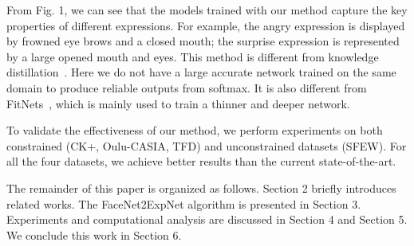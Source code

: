 \documentclass[a4paper, 10pt, conference]{ieeeconf}      %
\begin{document}
From Fig. 1, we can see that the models trained with our method capture the key properties of different expressions. For example, the angry expression is displayed by frowned eye brows and a closed mouth; the surprise expression is represented by a large opened mouth and eyes. 
This method is different from knowledge distillation~\cite{hinton2015distilling}. Here we do not have a large accurate network trained on the same domain to produce reliable outputs from softmax. It is also different from FitNets~\cite{romero2014fitnets}, which is mainly used to train a thinner and deeper network.

To validate the effectiveness of our method, we perform experiments on both constrained (CK+, Oulu-CASIA, TFD) and unconstrained datasets (SFEW). For all the four datasets, we achieve better results than the current state-of-the-art.  

The remainder of this paper is organized as follows. Section 2 briefly introduces related works. The FaceNet2ExpNet algorithm is presented in Section 3. Experiments and computational analysis are discussed in Section 4 and Section 5. We conclude this work in Section 6.





\end{document}
